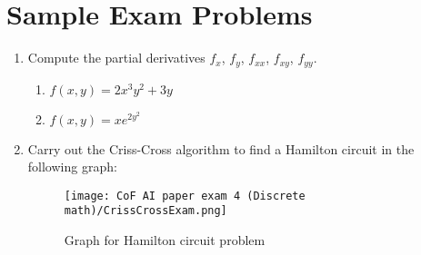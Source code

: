 \documentclass[12pt]{article}
\begin{document}
\section*{Sample Exam Problems}

\begin{enumerate}[label=\textbf{Problem \arabic*.}, leftmargin=*]

\item Compute the partial derivatives $f_{x}$, $f_{y}$, $f_{xx}$, $f_{xy}$, $f_{yy}$.
\begin{enumerate}[label=(\alph*)]
\item $f(x,y)= 2x^3y^2 + 3y$
\vspace{3cm}
\item $f(x,y) = x e^{2y^2}$
\vspace{3cm}
\end{enumerate}



%

\item Carry out the Criss-Cross algorithm to find a Hamilton circuit in the following graph:
\begin{figure}[H]
\centering
\texttt{[image: CoF AI paper exam 4 (Discrete math)/CrissCrossExam.png]}
\caption{Graph for Hamilton circuit problem}
\end{figure}
\vspace{3cm}


\end{enumerate}
\end{document}
